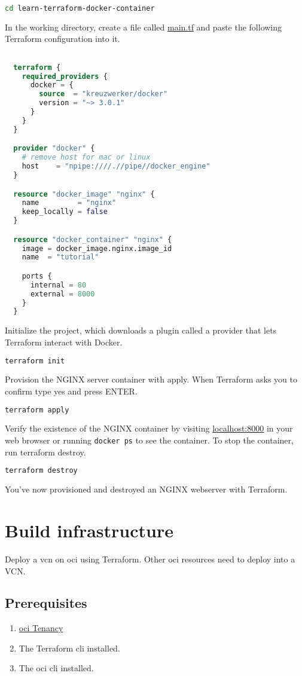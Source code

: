 \documentclass[../main.tex]{subfiles}
\begin{document}
\begin{lstlisting}[language=bash]
  cd learn-terraform-docker-container
\end{lstlisting}
In the working directory, create a file called \href{run:../resources/learn-terraform-docker-container/main.tf}{main.tf} and paste the following Terraform configuration into it.
\begin{lstlisting}[language=Terraform, caption={main.tf}]

  terraform {
    required_providers {
      docker = {
        source  = "kreuzwerker/docker"
        version = "~> 3.0.1"
      }
    }
  }

  provider "docker" {
    # remove host for mac or linux
    host    = "npipe:////.//pipe//docker_engine"
  }

  resource "docker_image" "nginx" {
    name         = "nginx"
    keep_locally = false
  }

  resource "docker_container" "nginx" {
    image = docker_image.nginx.image_id
    name  = "tutorial"

    ports {
      internal = 80
      external = 8000
    }
  }
\end{lstlisting}
Initialize the project, which downloads a plugin called a provider that lets Terraform interact with Docker.

\begin{lstlisting}[language=bash]
  terraform init
\end{lstlisting}
Provision the NGINX server container with apply. When Terraform asks you to confirm type yes and press ENTER.
\begin{lstlisting}[language=bash]
  terraform apply
\end{lstlisting}
Verify the existence of the NGINX container by visiting \url{localhost:8000} in your web browser or running \lstinline{docker ps} to see the container.
To stop the container, run terraform destroy.
\begin{lstlisting}[language=bash]
  terraform destroy
\end{lstlisting}
You've now provisioned and destroyed an NGINX webserver with Terraform.

\section{Build infrastructure}
Deploy a \acrfull{vcn} on \acrfull{oci} using Terraform. Other \acrshort{oci} resources need to deploy into a VCN.
\subsection{Prerequisites}
\begin{enumerate}
  \item{\href{https://docs.oracle.com/en/cloud/foundation/cloud_architecture/governance/tenancy.html}{\acrshort{oci} Tenancy}}
  \item{The Terraform \acrfull{cli} installed.}
  \item{The \acrshort{oci} \acrshort{cli} installed.}
\end{enumerate}
\end{document}
